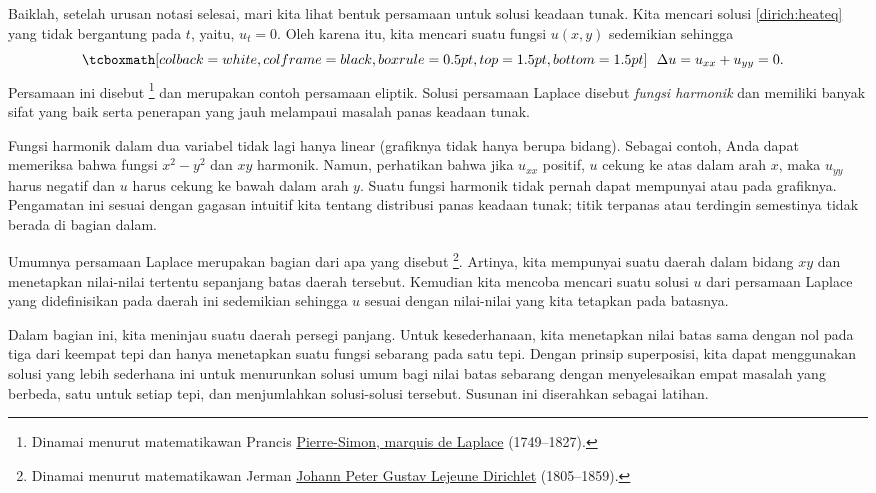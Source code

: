 Baiklah, setelah urusan notasi selesai, mari kita lihat bentuk persamaan
untuk solusi keadaan tunak.  Kita mencari solusi
\eqref{dirich:heateq} yang tidak bergantung pada $t$, yaitu,
$u_t = 0$.
Oleh karena itu, kita mencari suatu
fungsi $u(x,y)$ sedemikian sehingga
\begin{equation*}
\mybxbg{~~
\Delta u = 
u_{xx} + u_{yy} = 0 .
~~}
\end{equation*}
Persamaan ini disebut \emph{}%
\footnote{Dinamai menurut matematikawan Prancis
\href{https://en.wikipedia.org/wiki/Laplace}{Pierre-Simon, marquis de Laplace}
(1749--1827).} dan merupakan contoh persamaan eliptik.
Solusi persamaan Laplace
disebut \emph{fungsi harmonik}
dan memiliki banyak sifat yang baik serta
penerapan yang jauh melampaui masalah panas keadaan tunak.

Fungsi harmonik dalam dua variabel tidak lagi hanya linear
(grafiknya tidak hanya berupa bidang).  Sebagai contoh, Anda dapat memeriksa bahwa fungsi
$x^2-y^2$ dan $xy$ harmonik.  Namun, perhatikan bahwa jika $u_{xx}$ positif, $u$ cekung
ke atas dalam arah $x$, maka $u_{yy}$ harus negatif dan $u$ harus
cekung ke bawah dalam arah $y$.  Suatu fungsi harmonik tidak pernah dapat
mempunyai  atau  pada grafiknya.  Pengamatan ini
sesuai dengan gagasan intuitif kita tentang distribusi panas keadaan tunak;
titik terpanas atau terdingin semestinya tidak berada di bagian dalam.

Umumnya persamaan Laplace merupakan bagian dari apa yang disebut
\emph{}%
\footnote{Dinamai menurut matematikawan Jerman
\href{https://en.wikipedia.org/wiki/Dirichlet}{Johann Peter Gustav Lejeune Dirichlet}
(1805--1859).}.
Artinya,
kita mempunyai suatu daerah dalam bidang $xy$ dan menetapkan nilai-nilai tertentu sepanjang
batas daerah tersebut.  Kemudian kita mencoba mencari suatu solusi $u$ dari
persamaan Laplace yang didefinisikan pada
daerah ini sedemikian sehingga $u$ sesuai dengan nilai-nilai yang kita tetapkan pada
batasnya.

Dalam bagian ini, kita meninjau suatu daerah persegi panjang.  Untuk kesederhanaan,
kita menetapkan nilai batas sama dengan nol pada tiga dari keempat tepi dan hanya
menetapkan suatu fungsi sebarang pada satu tepi.
Dengan prinsip superposisi, kita dapat menggunakan solusi yang lebih sederhana ini
untuk menurunkan solusi umum
bagi nilai batas sebarang dengan menyelesaikan empat masalah yang berbeda,
satu untuk setiap tepi, dan menjumlahkan solusi-solusi tersebut.
Susunan ini diserahkan sebagai latihan.

